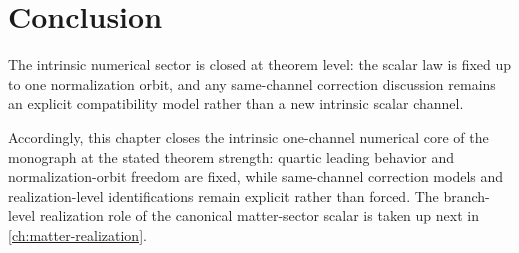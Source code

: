 \section{Conclusion}
\label{sec:shell-conclusion}

The intrinsic numerical sector is closed at theorem level:
the scalar law is fixed up to one normalization orbit, and any
same-channel correction discussion remains an explicit compatibility
model rather than a new intrinsic scalar channel.

Accordingly, this chapter closes the intrinsic one-channel numerical
core of the monograph at the stated theorem strength: quartic leading
behavior and normalization-orbit freedom are fixed, while
same-channel correction models and realization-level identifications
remain explicit rather than forced.
The branch-level realization role of the canonical matter-sector
scalar is taken up next in \cref{ch:matter-realization}.

\begin{chapterclosing}
\end{chapterclosing}
